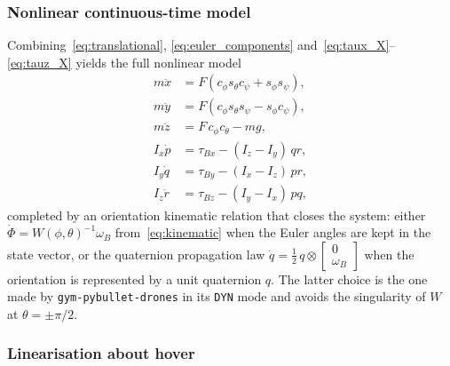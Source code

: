 \documentclass[11pt,a4paper]{article}
\theoremstyle{remark}
\numberwithin{equation}{section}
\begin{document}
\subsubsection*{Nonlinear continuous-time model}

Combining~\eqref{eq:translational}, \eqref{eq:euler_components}
and~\eqref{eq:taux_X}--\eqref{eq:tauz_X} yields the full nonlinear model
\begin{align}
m \ddot{x} &= F \left( c_\phi s_\theta c_\psi + s_\phi s_\psi \right), \label{eq:nl_x}\\
m \ddot{y} &= F \left( c_\phi s_\theta s_\psi - s_\phi c_\psi \right), \label{eq:nl_y}\\
m \ddot{z} &= F\, c_\phi c_\theta - m g, \label{eq:nl_z}\\
I_x \dot{p} &= \tau_{Bx} - (I_z - I_y)\, q r, \label{eq:nl_p}\\
I_y \dot{q} &= \tau_{By} - (I_x - I_z)\, p r, \label{eq:nl_q}\\
I_z \dot{r} &= \tau_{Bz} - (I_y - I_x)\, p q, \label{eq:nl_r}
\end{align}
completed by an orientation kinematic relation that closes the system: either
$\dot{\Phi} = W(\phi, \theta)^{-1} \omega_B$ from~\eqref{eq:kinematic} when the Euler angles
are kept in the state vector, or the quaternion propagation law
$\dot{q} = \tfrac{1}{2}\, q \otimes \begin{bmatrix} 0 \\ \omega_B \end{bmatrix}$ when the
orientation is represented by a unit quaternion $q$. The latter choice is the one made by
\texttt{gym-pybullet-drones} in its \texttt{DYN} mode and avoids the singularity of $W$
at $\theta = \pm\pi/2$.

\subsubsection*{Linearisation about hover}
\end{document}
